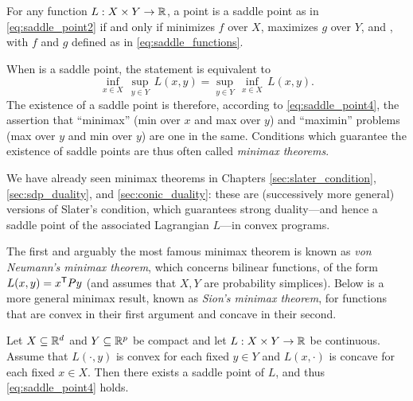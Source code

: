 \begin{Theorem}
\label{thm:saddle_point_optimality2}
For any function $L : X \times Y \to \mathbb{R}$, a point  is a saddle point as in \eqref{eq:saddle_point2} if and only if 
 minimizes $f$ over $X$,  maximizes $g$ 
over $Y$, and , with $f$ and $g$ defined as in   
\eqref{eq:saddle_functions}. 
\end{Theorem}

When  is a saddle point, the
statement  is equivalent to 
\begin{equation}
\label{eq:saddle_point4}
\inf_{x \in X} \, \sup_{y \in Y} \, L(x,y) = \sup_{y \in Y} \, \inf_{x \in X} \,
L(x,y).
\end{equation}
The existence of a saddle point is therefore, according to
\eqref{eq:saddle_point4}, the assertion that ``minimax'' (min over $x$ and max
over $y$) and ``maximin'' problems (max over $y$ and min over $y$) are one in
the same. Conditions which guarantee the existence of saddle points are
thus often called \emph{minimax theorems}. 

We have already seen minimax theorems in Chapters \ref{sec:slater_condition},
\ref{sec:sdp_duality}, and \ref{sec:conic_duality}: these are (successively more  
general) versions of Slater's condition, which guarantees strong duality---and 
hence a saddle point of the associated Lagrangian $L$---in convex programs.   

The first and arguably the most famous minimax theorem is known as \emph{von
  Neumann's minimax theorem}, which concerns bilinear functions, of the form
$L(x,y) = x^{\mathsf{T}} P y$ (and assumes that $X,Y$ are probability simplices). Below is
a more general minimax result, known as \emph{Sion's minimax theorem}, for 
functions that are convex in their first argument and concave in their second.      

\begin{Theorem}
\label{thm:sion_minimax}
Let $X \subseteq \mathbb{R}^d$ and $Y \subseteq \mathbb{R}^p$ be compact and let $L : X \times Y
\to \mathbb{R}$ be continuous. Assume that $L(\cdot,y)$ is convex for each fixed $y \in
Y$ and $L(x,\cdot)$ is concave for each fixed $x \in X$. Then there exists a
saddle point  of $L$, and thus
\eqref{eq:saddle_point4} holds. 
\end{Theorem}

